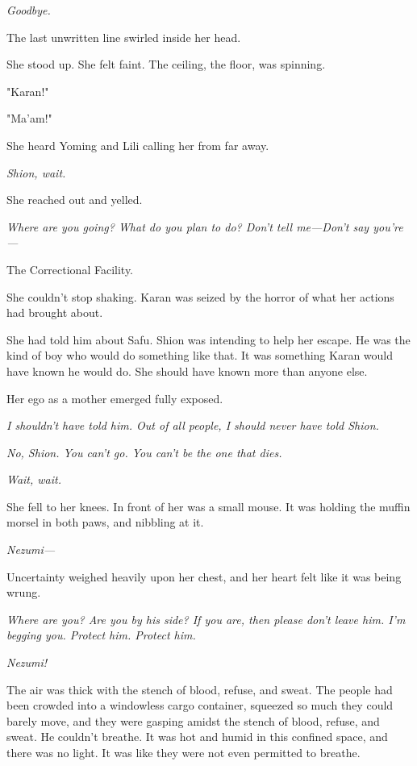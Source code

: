 \emph{Goodbye.}

The last unwritten line swirled inside her head.

She stood up. She felt faint. The ceiling, the floor, was spinning.

"Karan!"

"Ma'am!"

She heard Yoming and Lili calling her from far away.

\emph{Shion, wait.}

She reached out and yelled.

\emph{Where are you going? What do you plan to do? Don't tell me---Don't
say you're---}

The Correctional Facility.

She couldn't stop shaking. Karan was seized by the horror of what her
actions had brought about.

She had told him about Safu. Shion was intending to help her escape. He
was the kind of boy who would do something like that. It was something
Karan would have known he would do. She should have known more than
anyone else.

Her ego as a mother emerged fully exposed.

\emph{I shouldn't have told him. Out of all people, I should never have
told Shion.}

\emph{No, Shion. You can't go. You can't be the one that dies.}

\emph{Wait, wait.}

She fell to her knees. In front of her was a small mouse. It was holding
the muffin morsel in both paws, and nibbling at it.

\emph{Nezumi---}

Uncertainty weighed heavily upon her chest, and her heart felt like it
was being wrung.

\emph{Where are you? Are you by his side? If you are, then please don't leave
him. I'm begging you. Protect him. Protect him.}

\emph{Nezumi!}

\myspace

The air was thick with the stench of blood, refuse, and sweat. The
people had been crowded into a windowless cargo container, squeezed so
much they could barely move, and they were gasping amidst the stench of
blood, refuse, and sweat. He couldn't breathe. It was hot and humid in
this confined space, and there was no light. It was like they were not
even permitted to breathe.

